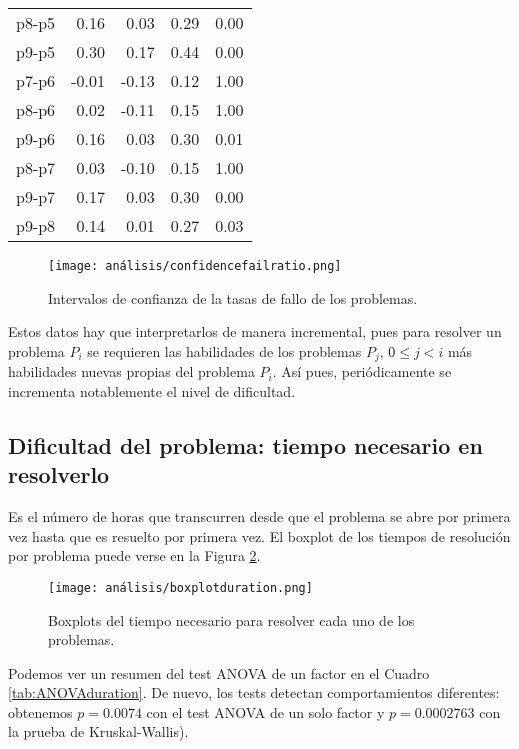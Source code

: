 \begin{table}[H]
\begin{tabular}{rrrrr}
  p8-p5 & 0.16 & 0.03 & 0.29 & 0.00 \\ 
  p9-p5 & 0.30 & 0.17 & 0.44 & 0.00 \\ 
  p7-p6 & -0.01 & -0.13 & 0.12 & 1.00 \\ 
  p8-p6 & 0.02 & -0.11 & 0.15 & 1.00 \\ 
  p9-p6 & 0.16 & 0.03 & 0.30 & 0.01 \\ 
  p8-p7 & 0.03 & -0.10 & 0.15 & 1.00 \\ 
  p9-p7 & 0.17 & 0.03 & 0.30 & 0.00 \\ 
  p9-p8 & 0.14 & 0.01 & 0.27 & 0.03 \\ 
   \hline
\end{tabular}
\end{table}

\begin{figure}[H]
    \centering
    \texttt{[image: análisis/confidencefailratio.png]}
    \caption{Intervalos de confianza de la tasas de fallo de los problemas.}
    \label{fig:confidenceratiofail}
\end{figure}

Estos datos hay que interpretarlos de manera incremental, pues para resolver un problema $P_i$ se requieren las habilidades de los problemas $P_j$, $0\leq j < i$ más habilidades nuevas propias del problema $P_i$. Así pues, periódicamente se incrementa notablemente el nivel de dificultad. %

\subsection{Dificultad del problema: tiempo necesario en resolverlo}

Es el número de horas que transcurren desde que el problema se abre por primera vez hasta que es resuelto por primera vez. El boxplot de los tiempos de resolución por problema puede verse en la Figura \ref{fig:boxplotduration}.

\begin{figure}[H]
    \centering
    \texttt{[image: análisis/boxplotduration.png]}
    \caption{Boxplots del tiempo necesario para resolver cada uno de los problemas.}
    \label{fig:boxplotduration}
\end{figure}

Podemos ver un resumen del test ANOVA de un factor en el Cuadro \ref{tab:ANOVAduration}. De nuevo, los tests detectan comportamientos diferentes: obtenemos $p=0.0074$ con el test ANOVA de un solo factor y $p=0.0002763$ con la prueba de Kruskal-Wallis).

